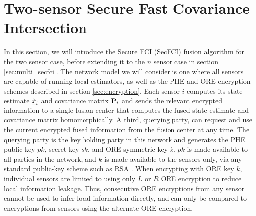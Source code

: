 \documentclass[letterpaper, 10 pt, conference]{ieeeconf}  %
\begin{document}
\section{Two-sensor Secure Fast Covariance Intersection} \label{sec:secfci}
In this section, we will introduce the Secure FCI (SecFCI) fusion algorithm for the two sensor case, before extending it to the $n$ sensor case in section \ref{sec:multi_secfci}. The network model we will consider is one where all sensors are capable of running local estimators, as well as the PHE and ORE encryption schemes described in section \ref{sec:encryption}. Each sensor $i$ computes its state estimate $\hat{{\underline{x}}}_i$ and covariance matrix ${{\mathbf{P}}}_i$ and sends the relevant encrypted information to a single fusion center that computes the fused state estimate and covariance matrix homomorphically. A third, querying party, can request and use the current encrypted fused information from the fusion center at any time. The querying party is the key holding party in this network and generates the PHE public key $pk$, secret key $sk$, and ORE symmetric key $k$. $pk$ is made available to all parties in the network, and $k$ is made available to the sensors only, via any standard public-key scheme such as RSA \cite{rivestMethodObtainingDigital1978}. When encrypting with ORE key $k$, individual sensors are limited to using only $L$ or $R$ ORE encryption to reduce local information leakage. Thus, consecutive ORE encryptions from any sensor cannot be used to infer local information directly, and can only be compared to encryptions from sensors using the alternate ORE encryption.
\end{document}
